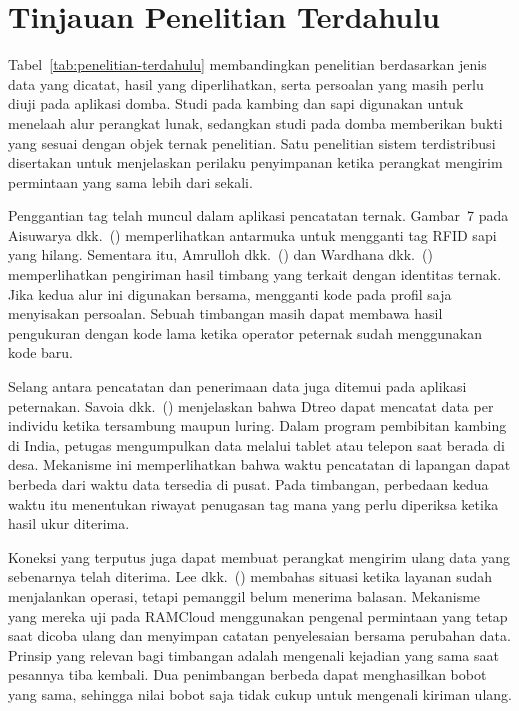 \section{Tinjauan Penelitian Terdahulu}

Tabel~\ref{tab:penelitian-terdahulu} membandingkan penelitian berdasarkan jenis data
yang dicatat, hasil yang diperlihatkan, serta persoalan yang masih perlu diuji pada
aplikasi domba. Studi pada kambing dan sapi digunakan untuk menelaah alur perangkat
lunak, sedangkan studi pada domba memberikan bukti yang sesuai dengan objek ternak
penelitian. Satu penelitian sistem terdistribusi disertakan untuk menjelaskan perilaku
penyimpanan ketika perangkat mengirim permintaan yang sama lebih dari sekali.

Penggantian tag telah muncul dalam aplikasi pencatatan ternak. Gambar~7 pada Aisuwarya
dkk.~(\citeyear{aisuwarya2019rfid}) memperlihatkan antarmuka untuk mengganti tag RFID
sapi yang hilang. Sementara itu, Amrulloh dkk.~(\citeyear{amrulloh2024integrasi}) dan
Wardhana dkk.~(\citeyear{wardhana2026pemantauan}) memperlihatkan pengiriman hasil
timbang yang terkait dengan identitas ternak. Jika kedua alur ini digunakan bersama,
mengganti kode pada profil saja menyisakan persoalan. Sebuah timbangan masih dapat
membawa hasil pengukuran dengan kode lama ketika {\setlength{\fboxsep}{1pt}\colorbox{revisilama}{operator}} {\setlength{\fboxsep}{1pt}\colorbox{revisibaru}{peternak}} sudah menggunakan kode baru.

Selang antara pencatatan dan penerimaan data juga ditemui pada aplikasi peternakan.
Savoia dkk.~(\citeyear{savoia2023dtreo}) menjelaskan bahwa Dtreo dapat mencatat data
per individu ketika tersambung maupun luring. Dalam program pembibitan kambing di
India, petugas mengumpulkan data melalui tablet atau telepon saat berada di desa.
Mekanisme ini memperlihatkan bahwa waktu pencatatan di lapangan dapat berbeda dari
waktu data tersedia di pusat. Pada timbangan, perbedaan kedua waktu itu menentukan
riwayat penugasan tag mana yang perlu diperiksa ketika hasil ukur diterima.

Koneksi yang terputus juga dapat membuat perangkat mengirim ulang data yang sebenarnya
telah diterima. Lee dkk.~(\citeyear{lee2015rifl}) membahas situasi ketika layanan
sudah menjalankan operasi, tetapi pemanggil belum menerima balasan. Mekanisme yang
mereka uji pada RAMCloud menggunakan pengenal permintaan yang tetap saat dicoba ulang
dan menyimpan catatan penyelesaian bersama perubahan data. Prinsip yang relevan bagi
timbangan adalah mengenali kejadian yang sama saat pesannya tiba kembali. Dua
penimbangan berbeda dapat menghasilkan bobot yang sama, sehingga nilai bobot saja
tidak cukup untuk mengenali kiriman ulang.

